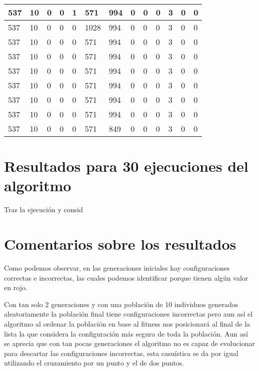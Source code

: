 \begin{table}[H]
\begin{tabular}{|l|l|l|l|l|l|l|l|l|l|l|l|l|}
537  &  10  &  0  &  0  &  1  &  571  &  994  &  0  &  0  &  0  &  3  &  0  &  0 \\ \hline
537  &  10  &  0  &  0  &  0  &  1028  &  994  &  0  &  0  &  0  &  3  &  0  &  0 \\ \hline
537  &  10  &  0  &  0  &  0  &  571  &  994  &  0  &  0  &  0  &  3  &  0  &  0 \\ \hline
537  &  10  &  0  &  0  &  0  &  571  &  994  &  0  &  0  &  0  &  3  &  0  &  0 \\ \hline
537  &  10  &  0  &  0  &  0  &  571  &  994  &  0  &  0  &  0  &  3  &  0  &  0 \\ \hline
537  &  10  &  0  &  0  &  0  &  571  &  994  &  0  &  0  &  0  &  3  &  0  &  0 \\ \hline
537  &  10  &  0  &  0  &  0  &  571  &  994  &  0  &  0  &  0  &  3  &  0  &  0 \\ \hline
537  &  10  &  0  &  0  &  0  &  571  &  994  &  0  &  0  &  0  &  3  &  0  &  0 \\ \hline
537  &  10  &  0  &  0  &  0  &  571  &  849  &  0  &  0  &  0  &  3  &  0  &  0 \\ \hline
\end{tabular}
\end{table}

\section{Resultados para 30 ejecuciones del algoritmo}

Tras la ejecución y consid

\section{Comentarios sobre los resultados}

Como podemos observar, en las generaciones iniciales hay configuraciones correctas e incorrectas, las cuales podemos identificar porque tienen algún valor en rojo. 

\bigskips
Con tan solo 2 generaciones y con una población de 10 individuos generados aleatoriamente la población final tiene configuraciones incorrectas pero aun así el algoritmo al ordenar la población en base al fitness nos posicionará al final de la lista la que considera la configuración más segura de toda la población. Aun así se aprecia que con tan pocas generaciones el algoritmo no es capaz de evolucionar para descartar las configuraciones incorrectas, esta casuística se da por igual utilizando el cruzamiento por un punto y el de dos puntos.

